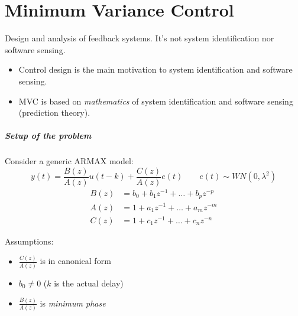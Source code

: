 \chapter{Minimum Variance Control}

Design and analysis of feedback systems.
It's not system identification nor software sensing.

\begin{itemize}
    \item Control design is the main motivation to system identification and software sensing.
    \item MVC is based on \emph{mathematics} of system identification and software sensing (prediction theory).
\end{itemize}

\paragraph{Setup of the problem} Consider a generic ARMAX model:
\[
    y(t) = \frac{B(z)}{A(z)}u(t-k) + \frac{C(z)}{A(z)}e(t) \qquad e(t) \sim WN(0, \lambda^2)
\]
\begin{align*}
    B(z) &= b_0 + b_1z^{-1} + \dots + b_pz^{-p} \\
    A(z) &= 1   + a_1z^{-1} + \dots + a_mz^{-m} \\
    C(z) &= 1   + c_1z^{-1} + \dots + c_nz^{-n}
\end{align*}

Assumptions:
\begin{itemize}
    \item $\frac{C(z)}{A(z)}$ is in canonical form
    \item $b_0\ne 0$ ($k$ is the actual delay)
    \item $\frac{B(z)}{A(z)}$ is \emph{minimum phase}
\end{itemize}

